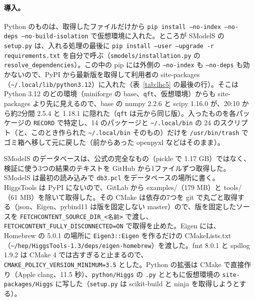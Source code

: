 \documentclass[a4paper,10pt]{ltjsarticle}
\newcommand{\pth}[1]{\texttt{\textasciitilde/}\nolinkurl{#1}}
\begin{document}
\paragraph{導入。}Python のものは、取得したファイルだけから \texttt{pip install --no-index --no-deps --no-build-isolation} で仮想環境に入れた。ところが SModelS の \texttt{setup.py} は、入れる処理の最後に \texttt{pip install --user --upgrade -r requirements.txt} を自分で呼ぶ（\texttt{smodels/installation.py} の \texttt{resolve\_dependencies}）。この中の pip には外側の \texttt{--no-index} も \texttt{--no-deps} も効かないので、PyPI から最新版を取得して利用者の site-packages（\pth{.local/lib/python3.12}）に入れた（表~\ref{tab:lhc5} の最後の行）。そこは Python 3.12 のどの環境（miniforge の base、\texttt{qft}、仮想環境）からも site-packages より先に見えるので、base の numpy 2.2.6 と scipy 1.16.0 が、20:10 から約2分間 2.5.4 と 1.18.1 に隠れた（\texttt{qft} は元から同じ版）。入ったものを各パッケージの \texttt{RECORD} で特定し、14 のパッケージと \pth{.local/bin} の 24 のスクリプト（と、このとき作られた \pth{.local/bin} そのもの）だけを \texttt{/usr/bin/trash} でゴミ箱へ移して元に戻した（前からあった openpyxl などはそのまま）。

SModelS のデータベースは、公式の完全なもの（pickle で 1.17 GB）ではなく、検証に使う3つの結果のテキストを GitHub から1ファイルずつ取得した。SModelS は最初の読み込みで \texttt{db3.pcl} をデータベースの場所に書く。HiggsTools は PyPI にないので、GitLab から examples/（179 MB）と tools/（61 MB）を除いて取得した。その CMake は依存の7つを git で丸ごと取得する（json、Eigen、pybind11 は版を固定しない master）ので、版を固定したソースを \texttt{FETCHCONTENT\_}\allowbreak\texttt{SOURCE\_DIR\_<名前>} で渡し、\texttt{FETCHCONTENT\_}\allowbreak\texttt{FULLY\_DISCONNECTED=ON} で取得を止めた。Eigen には、Homebrew の 5.0.1 の場所に \texttt{Eigen3::Eigen} を作るだけの CMakeLists.txt（\pth{hep/HiggsTools-1.3/deps/eigen-homebrew}）を渡した。fmt 8.0.1 と spdlog 1.9.2 は CMake 4 では古すぎると止まるので、\texttt{CMAKE\_POLICY\_}\allowbreak\texttt{VERSION\_MINIMUM=3.5} とした。Python の拡張は CMake で直接作り（Apple clang、11.5 秒）、\texttt{python/Higgs} の \texttt{.py} とともに仮想環境の \texttt{site-packages/Higgs} に写した（\texttt{setup.py} は scikit-build と ninja を取得しようとする）。
\end{document}
